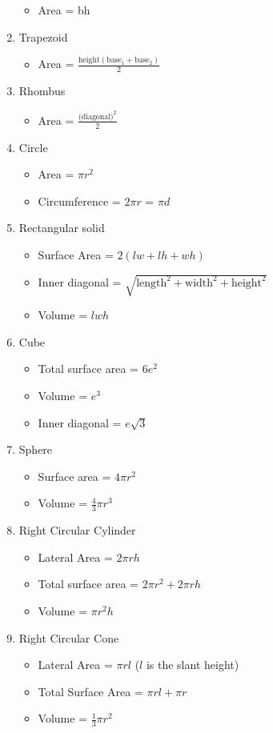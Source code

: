 \documentclass[../uilmath.tex]{subfiles}
\begin{document}
\begin{enumerate}
    \begin{itemize}
        \item Area = bh 
    \end{itemize}
    \item Trapezoid 
    \begin{itemize}
        \item Area = $\frac{\text{height}(\text{base}_1+\text{base}_2)}{2}$
    \end{itemize}
    \item Rhombus 
    \begin{itemize}
        \item Area = $\frac{\text{(diagonal)}^2}{2}$
    \end{itemize}
    \item Circle 
    \begin{itemize}
        \item Area = $\pi r^2$
        \item Circumference = $2\pi r$ = $\pi d$
    \end{itemize}
    \item Rectangular solid 
    \begin{itemize}
        \item Surface Area = $2(lw+lh+wh)$
        \item Inner diagonal = $\sqrt{\text{length}^2+\text{width}^2+\text{height}^2}$
        \item Volume = $lwh$
    \end{itemize}
    \item Cube 
    \begin{itemize}
        \item Total surface area = 6$e^2$
        \item Volume = $e^3$
        \item Inner diagonal = $e\sqrt{3}$
    \end{itemize}
    \item Sphere 
    \begin{itemize}
        \item Surface area = $4\pi r^2$
        \item Volume = $\frac{4}{3}\pi r^3$
    \end{itemize}
    \item Right Circular Cylinder 
    \begin{itemize}
        \item Lateral Area = $2\pi rh$
        \item Total surface area = $2\pi r^2+2\pi rh$
        \item Volume = $\pi r^2 h$
    \end{itemize}
    \item Right Circular Cone 
    \begin{itemize}
        \item Lateral Area = $\pi r l$ ($l$ is the slant height)
        \item Total Surface Area = $\pi r l +\pi r$
        \item Volume = $\frac{1}{3}\pi r^2$
    \end{itemize}
\end{enumerate}
\end{document}

